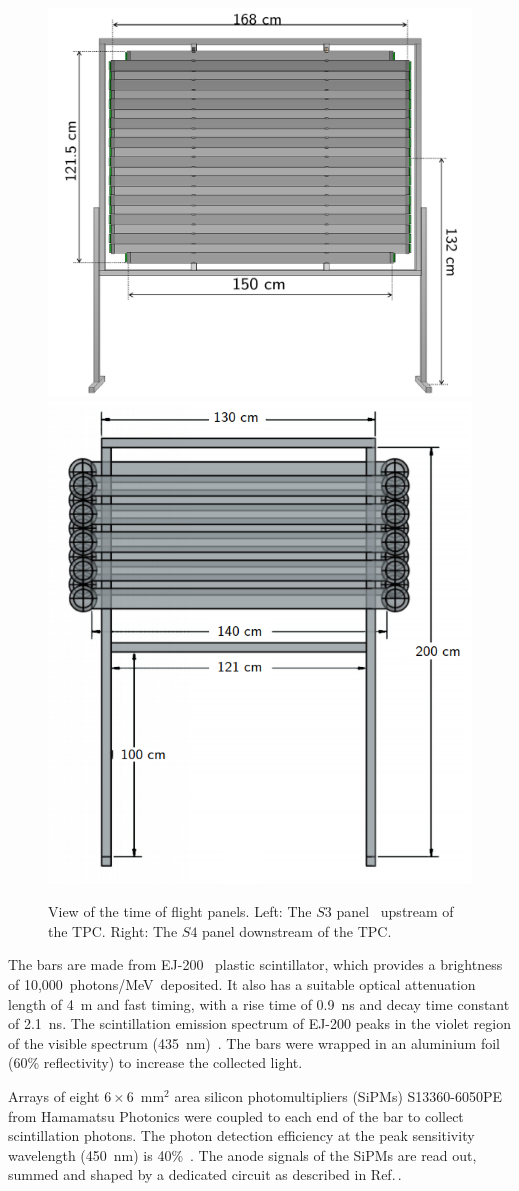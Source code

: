 \begin{figure}
  \centering
  \includegraphics[width=0.52\linewidth]{files/Figures/uToF_sketch.pdf}
  \hfill
  \includegraphics[width=0.47\linewidth]{files/Figures/dstofFront2.png}
  \caption{View of the time of flight panels.
  Left: The $\mathit{S3}$ panel~\cite{S3-proceedings} upstream of the TPC. Right: The $\mathit{S4}$ panel downstream of the TPC.}
  \label{fig:S3sketch}
\end{figure}

The bars are made from EJ-200~\cite{SCIONIX} plastic scintillator, which provides a brightness of 10,000~photons/MeV~deposited.
It also has a suitable optical attenuation length of 4~m and fast timing, with a rise time of 0.9~ns and decay time constant of 2.1~ns.
The scintillation emission spectrum of EJ-200 peaks in the violet region of the visible spectrum (435~nm)~\cite{EJ200}.
The bars were wrapped in an aluminium foil (60\% reflectivity) to increase the collected light.

Arrays of eight $6 \times 6$~mm$^2$ area silicon photomultipliers (SiPMs) S13360-6050PE from Hamamatsu Photonics \cite{Hamamatsu} were coupled to each end of the bar to collect scintillation photons.
The photon detection efficiency at the peak sensitivity wavelength (450~nm) is 40\%~\cite{Hamamatsu}.
The anode signals of the SiPMs are read out, summed and shaped by a dedicated circuit as described in Ref.\,\cite{S3-readout}.

